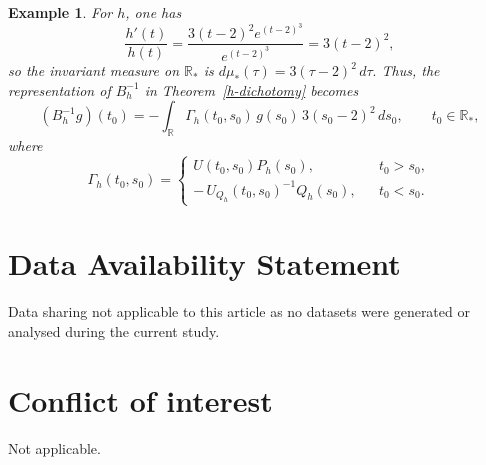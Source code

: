 \documentclass[10pt]{amsart}
\newtheorem{example}{Example}
\numberwithin{equation}{section}
\begin{document}
\begin{example}
For  $h$, one has
\[
\frac{h'(t)}{h(t)}=\frac{3(t-2)^2 e^{(t-2)^3}}{e^{(t-2)^3}}
=3(t-2)^2,
\]
so the invariant measure on $\mathbb R_*$ is
$
d\mu_*(\tau)=3(\tau-2)^2\,d\tau.
$
Thus, the representation of $B_h^{-1}$ in Theorem~\ref{h-dichotomy} becomes
\[
(B_h^{-1}g)(t_0)
=-\int_{\mathbb R}\Gamma_h(t_0,s_0)\,g(s_0)\,3(s_0-2)^2\,ds_0,
\qquad t_0\in\mathbb R_*,
\]
where
\begin{displaymath}
\Gamma_h(t_0,s_0)=\left\{\begin{array}{rcl}
U(t_0,s_0)P_h(s_0), & & t_0>s_0,\\
-\,U_{Q_h}(t_0,s_0)^{-1}Q_h(s_0), & & t_0<s_0.
\end{array}\right.
\end{displaymath}



\end{example}


\section*{Data Availability Statement}
Data sharing not applicable to this article as no datasets were generated or analysed during the current study.

\section*{Conflict of interest}
Not applicable.

   
\end{document}
